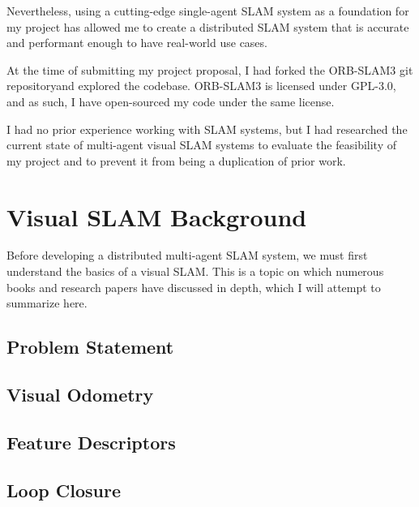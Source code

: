 Nevertheless, using a cutting-edge single-agent SLAM system as a foundation for my project has allowed me to create a distributed SLAM system that is accurate and performant enough to have real-world use cases.

At the time of submitting my project proposal, I had forked the ORB-SLAM3 \autocite{ORBSLAM3_TRO} git repository\footnotemark[1] and explored the codebase. ORB-SLAM3 is licensed under GPL-3.0, and as such, I have open-sourced my code under the same license\footnotemark[2].


I had no prior experience working with SLAM systems, but I had researched the current state of multi-agent visual SLAM systems to evaluate the feasibility of my project and to prevent it from being a duplication of prior work.

\section{Visual SLAM Background}
\label{sec:visual-slam-background}
Before developing a distributed multi-agent SLAM system, we must first understand the basics of a visual SLAM. This is a topic on which numerous books \autocite{gao2021introduction} and research papers \autocite{durrant2006simultaneous} have discussed in depth, which I will attempt to summarize here.

\subsection{Problem Statement}
\label{sec:visual-slam-problem-statement}


\subsection{Visual Odometry}
\label{sec:visual-slam-visual-odometry}


\subsection{Feature Descriptors}
\label{sec:visual-slam-feature-descriptors}


\subsection{Loop Closure}
\label{sec:visual-slam-loop-closure}


